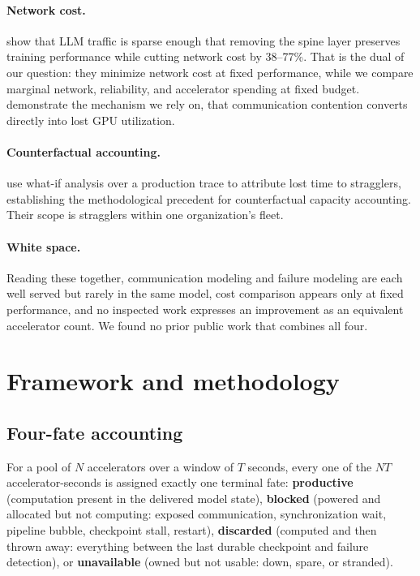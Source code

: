 \documentclass[11pt]{article}
\begin{document}
\paragraph{Network cost.} \citet{wang2023railonly} show that LLM traffic is
sparse enough that removing the spine layer preserves training performance while
cutting network cost by 38--77\%. That is the dual of our question: they
minimize network cost at fixed performance, while we compare marginal network,
reliability, and accelerator spending at fixed budget. \citet{cao2024crux}
demonstrate the mechanism we rely on, that communication contention converts
directly into lost GPU utilization.

\paragraph{Counterfactual accounting.} \citet{lin2025stragglers} use what-if
analysis over a production trace to attribute lost time to stragglers,
establishing the methodological precedent for counterfactual capacity
accounting. Their scope is stragglers within one organization's fleet.

\paragraph{White space.} Reading these together, communication modeling and
failure modeling are each well served but rarely in the same model, cost
comparison appears only at fixed performance, and no inspected work expresses an
improvement as an equivalent accelerator count. We found no prior public work
that combines all four.

\section{Framework and methodology}
\label{sec:framework}

\subsection{Four-fate accounting}

For a pool of $N$ accelerators over a window of $T$ seconds, every one of the
$N T$ accelerator-seconds is assigned exactly one terminal fate: \textbf{productive}
(computation present in the delivered model state), \textbf{blocked} (powered and
allocated but not computing: exposed communication, synchronization wait,
pipeline bubble, checkpoint stall, restart), \textbf{discarded} (computed and then
thrown away: everything between the last durable checkpoint and failure
detection), or \textbf{unavailable} (owned but not usable: down, spare, or stranded).
\end{document}
